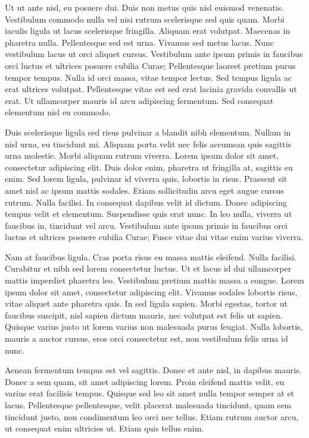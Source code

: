 \documentclass[12pt]{hw}
\begin{document}
Ut ut ante nisl, eu posuere dui. Duis non metus quis nisl euismod
venenatis. Vestibulum commodo nulla vel nisi rutrum scelerisque sed quis
quam. Morbi iaculis ligula ut lacus scelerisque fringilla. Aliquam erat
volutpat. Maecenas in pharetra nulla. Pellentesque sed est urna. Vivamus
sed metus lacus. Nunc vestibulum lacus ut orci aliquet cursus. Vestibulum
ante ipsum primis in faucibus orci luctus et ultrices posuere cubilia
Curae; Pellentesque laoreet pretium purus tempor tempus. Nulla id orci
massa, vitae tempor lectus. Sed tempus ligula ac erat ultrices volutpat.
Pellentesque vitae est sed erat lacinia gravida convallis ut erat. Ut
ullamcorper mauris id arcu adipiscing fermentum. Sed consequat elementum
nisl eu commodo.

Duis scelerisque ligula sed risus pulvinar a blandit nibh elementum. Nullam
in nisl urna, eu tincidunt mi. Aliquam porta velit nec felis accumsan quis
sagittis urna molestie. Morbi aliquam rutrum viverra. Lorem ipsum dolor sit
amet, consectetur adipiscing elit. Duis dolor enim, pharetra ut fringilla
at, sagittis eu enim. Sed lorem ligula, pulvinar id viverra quis, lobortis
in risus. Praesent sit amet nisl ac ipsum mattis sodales. Etiam
sollicitudin arcu eget augue cursus rutrum. Nulla facilisi. In consequat
dapibus velit id dictum. Donec adipiscing tempus velit et elementum.
Suspendisse quis erat nunc. In leo nulla, viverra ut faucibus in, tincidunt
vel arcu. Vestibulum ante ipsum primis in faucibus orci luctus et ultrices
posuere cubilia Curae; Fusce vitae dui vitae enim varius viverra.

Nam at faucibus ligula. Cras porta risus eu massa mattis eleifend. Nulla
facilisi. Curabitur et nibh sed lorem consectetur luctus. Ut et lacus id
dui ullamcorper mattis imperdiet pharetra leo. Vestibulum pretium mattis
massa a congue. Lorem ipsum dolor sit amet, consectetur adipiscing elit.
Vivamus sodales lobortis risus, vitae aliquet ante pharetra quis. In sed
ligula sapien. Morbi egestas, tortor ut faucibus suscipit, nisl sapien
dictum mauris, nec volutpat est felis ut sapien. Quisque varius justo ut
lorem varius non malesuada purus feugiat. Nulla lobortis, mauris a auctor
cursus, eros orci consectetur est, non vestibulum felis urna id nunc.

Aenean fermentum tempus est vel sagittis. Donec et ante nisl, in dapibus
mauris. Donec a sem quam, sit amet adipiscing lorem. Proin eleifend mattis
velit, eu varius erat facilisis tempus. Quisque sed leo sit amet nulla
tempor semper at et lacus. Pellentesque pellentesque, velit placerat
malesuada tincidunt, quam sem tincidunt justo, non condimentum leo orci nec
tellus. Etiam rutrum auctor arcu, ut consequat enim ultricies ut. Etiam
quis tellus enim.
\end{document}
